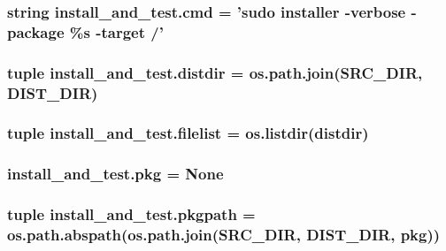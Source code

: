\subsubsection[{cmd}]{\setlength{\rightskip}{0pt plus 5cm}string install\+\_\+and\+\_\+test.\+cmd = 'sudo installer -\/verbose -\/package \%{\bf s} -\/target /'}\label{namespaceinstall__and__test_a2caf6de5a61cbc4aef129ef006832bde}
\hypertarget{namespaceinstall__and__test_a8ad1dc9d80932bac8c595bb0c3707e21}{}
\subsubsection[{distdir}]{\setlength{\rightskip}{0pt plus 5cm}tuple install\+\_\+and\+\_\+test.\+distdir = os.\+path.\+join(S\+R\+C\+\_\+\+D\+I\+R, D\+I\+S\+T\+\_\+\+D\+I\+R)}\label{namespaceinstall__and__test_a8ad1dc9d80932bac8c595bb0c3707e21}
\hypertarget{namespaceinstall__and__test_a26006d6aedea1e311101fcfea1833f27}{}
\subsubsection[{filelist}]{\setlength{\rightskip}{0pt plus 5cm}tuple install\+\_\+and\+\_\+test.\+filelist = os.\+listdir({\bf distdir})}\label{namespaceinstall__and__test_a26006d6aedea1e311101fcfea1833f27}
\hypertarget{namespaceinstall__and__test_ac1ad68fc58a71ee216c4926cc5f7ce65}{}
\subsubsection[{pkg}]{\setlength{\rightskip}{0pt plus 5cm}install\+\_\+and\+\_\+test.\+pkg = None}\label{namespaceinstall__and__test_ac1ad68fc58a71ee216c4926cc5f7ce65}
\hypertarget{namespaceinstall__and__test_ab5d67e165fcbe3d0504db021b4ac653a}{}
\subsubsection[{pkgpath}]{\setlength{\rightskip}{0pt plus 5cm}tuple install\+\_\+and\+\_\+test.\+pkgpath = os.\+path.\+abspath(os.\+path.\+join(S\+R\+C\+\_\+\+D\+I\+R, D\+I\+S\+T\+\_\+\+D\+I\+R, {\bf pkg}))}\label{namespaceinstall__and__test_ab5d67e165fcbe3d0504db021b4ac653a}
